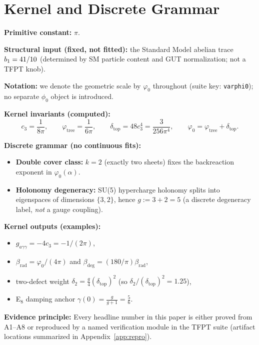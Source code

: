 \section*{Kernel and Discrete Grammar}

\begin{tcolorbox}[colback=gray!4, colframe=gray!60, title={\textbf{Kernel specification (inputs $\to$ outputs)}}, fonttitle=\bfseries\small]
\textbf{Primitive constant:} $\pi$.

\textbf{Structural input (fixed, not fitted):} the Standard Model abelian trace $b_1=41/10$ (determined by SM particle content and GUT normalization; not a TFPT knob).

\textbf{Notation:} we denote the geometric scale by $\varphi_0$ throughout (suite key: \texttt{varphi0}); no separate $\phi_0$ object is introduced.

\textbf{Kernel invariants (computed):}
\[
c_3=\frac{1}{8\pi},\qquad 
\varphi_{\mathrm{tree}}=\frac{1}{6\pi},\qquad
\delta_{\mathrm{top}}=48c_3^4=\frac{3}{256\pi^4},\qquad
\varphi_0=\varphi_{\mathrm{tree}}+\delta_{\mathrm{top}}.
\]

\textbf{Discrete grammar (no continuous fits):}
\begin{itemize}[leftmargin=1.5em, topsep=2pt, itemsep=1pt]
    \item \textbf{Double cover class:} $k=2$ (exactly two sheets) fixes the backreaction exponent in $\varphi_0(\alpha)$.
    \item \textbf{Holonomy degeneracy:} SU(5) hypercharge holonomy splits into eigenspaces of dimensions $\{3,2\}$, hence $g:=3+2=5$ (a discrete degeneracy label, \emph{not} a gauge coupling).
\end{itemize}

\textbf{Kernel outputs (examples):}
\begin{itemize}[leftmargin=1.5em, topsep=2pt, itemsep=1pt]
    \item $g_{a\gamma\gamma}=-4c_3=-1/(2\pi)$,
    \item $\beta_{\mathrm{rad}}=\varphi_0/(4\pi)$ and $\beta_{\mathrm{deg}}=(180/\pi)\beta_{\mathrm{rad}}$,
    \item two-defect weight $\delta_2=\tfrac{g}{4}(\delta_{\mathrm{top}})^2$ (so $\delta_2/(\delta_{\mathrm{top}})^2=1.25$),
    \item E$_8$ damping anchor $\gamma(0)=\tfrac{g}{g+1}=\tfrac56$.
\end{itemize}

\textbf{Evidence principle:} Every headline number in this paper is either proved from A1--A8 or reproduced by a named verification module in the TFPT suite (artifact locations summarized in Appendix~\ref{app:repro}).
\end{tcolorbox}

